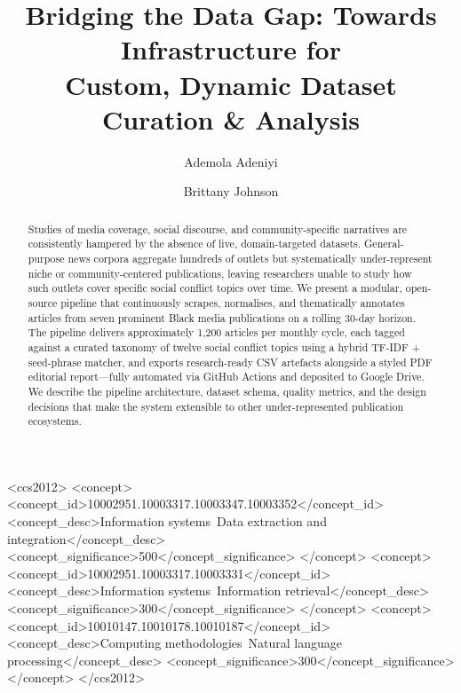 \documentclass[sigconf,anonymous,review]{acmart}
\begin{document}
\title{Bridging the Data Gap: Towards Infrastructure for\\
       Custom, Dynamic Dataset Curation \& Analysis}

\author{Ademola Adeniyi}

\author{Brittany Johnson}

\begin{abstract}
Studies of media coverage, social discourse, and community-specific narratives
are consistently hampered by the absence of live, domain-targeted datasets.
General-purpose news corpora aggregate hundreds of outlets but systematically
under-represent niche or community-centered publications, leaving researchers
unable to study how such outlets cover specific social conflict topics over time.
We present a modular, open-source pipeline that continuously scrapes, normalises,
and thematically annotates articles from seven prominent Black media publications
on a rolling 30-day horizon.
The pipeline delivers approximately 1,200 articles per monthly cycle, each tagged
against a curated taxonomy of twelve social conflict topics using a hybrid
TF-IDF + seed-phrase matcher, and exports research-ready CSV artefacts alongside
a styled PDF editorial report—fully automated via GitHub Actions and deposited
to Google Drive.
We describe the pipeline architecture, dataset schema, quality metrics, and the
design decisions that make the system extensible to other under-represented
publication ecosystems.
\end{abstract}

\begin{CCSXML}
<ccs2012>
   <concept>
       <concept_id>10002951.10003317.10003347.10003352</concept_id>
       <concept_desc>Information systems~Data extraction and integration</concept_desc>
       <concept_significance>500</concept_significance>
   </concept>
   <concept>
       <concept_id>10002951.10003317.10003331</concept_id>
       <concept_desc>Information systems~Information retrieval</concept_desc>
       <concept_significance>300</concept_significance>
   </concept>
   <concept>
       <concept_id>10010147.10010178.10010187</concept_id>
       <concept_desc>Computing methodologies~Natural language processing</concept_desc>
       <concept_significance>300</concept_significance>
   </concept>
</ccs2012>
\end{CCSXML}
\end{document}
